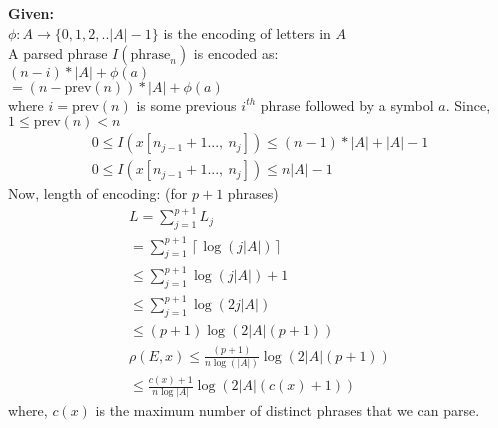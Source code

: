 \documentclass[paper=a4, fontsize=11pt]{scrartcl} %
\numberwithin{equation}{section} %
\numberwithin{figure}{section} %
\numberwithin{table}{section} %
\begin{document}
\subsection{}
\textbf{Given: }\\
$\phi: A\rightarrow \{0,1,2,.. |A|-1\}$ is the encoding of letters in $A$\\
A parsed phrase $I(\text{phrase}_n)$ is encoded as: \\
$(n-i)*|A| + \phi(a)$\\ 
$=(n-\text{prev}(n))*|A| + \phi(a)$\\
where $i=\text{prev}(n)$ is some previous $i^{th}$ phrase followed by a symbol $a$.
Since, $1\leq \text{prev}(n) < n$\\
\begin{align*}
	0\leq I(x[n_{j-1}+1...,\ n_j]) \leq (n-1)*|A| + |A|-1\\
	0\leq I(x[n_{j-1}+1...,\ n_j]) \leq n|A|-1
\end{align*}
Now, length of encoding:
(for $p+1$ phrases) 
\begin{align*}
	 L = \sum_{j=1}^{p+1}L_j\\
	 =\sum_{j=1}^{p+1}\left\lceil \log(j|A|)\right\rceil\\
	 \leq \sum_{j=1}^{p+1}\log(j|A|) + 1\\
	 \leq \sum_{j=1}^{p+1}\log(2j|A|)\\
	 \leq (p+1)\log(2|A|(p+1))\\
	\rho(E, x)\leq \frac{(p+1)}{n\log(|A|)}\log(2|A|(p+1))\\
\leq \frac{c(x)+1}{n\log|A|}\log(2|A|(c(x)+1))
\end{align*}
where, $c(x)$ is the maximum number of distinct phrases that we can parse. 
\end{document}
